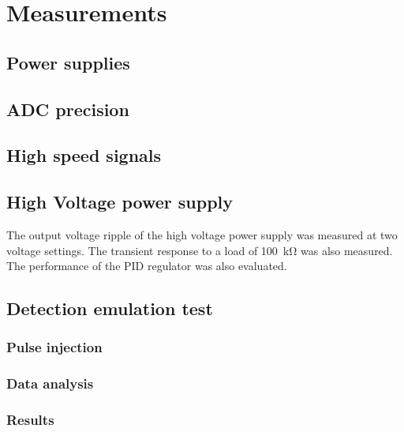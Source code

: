 \chapter{Measurements}
\section{Power supplies}
\section{ADC precision}
\section{High speed signals}
\section{High Voltage power supply}
The output voltage ripple of the high voltage power supply was measured at two voltage settings. The transient response to a load of \SI{100}{\kilo\ohm} was also measured. The performance of the PID regulator was also evaluated.

\section{Detection emulation test}
\subsection{Pulse injection}
\subsection{Data analysis}
\subsection{Results}